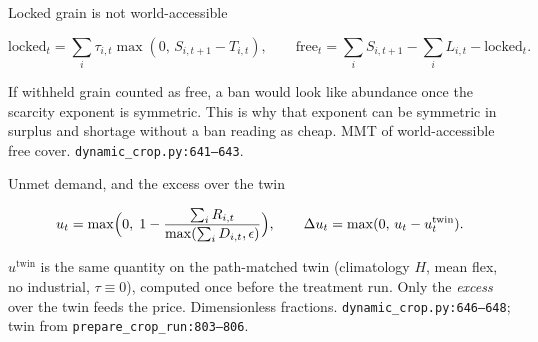 \begin{frame}{Locked grain is not world-accessible}

\[
\mathrm{locked}_t
= \sum_i \tau_{i,t}\max(0,\, S_{i,t+1}-T_{i,t}),
\qquad
\mathrm{free}_t
= \sum_i S_{i,t+1} - \sum_i L_{i,t} - \mathrm{locked}_t.
\]

If withheld grain counted as free, a ban would look like abundance once
the scarcity exponent is symmetric. This is why that exponent can be
symmetric in surplus and shortage without a ban reading as cheap.
{MMT of world-accessible free cover.}
{\texttt{dynamic\_crop.py:641--643}.}
\end{frame}

\begin{frame}{Unmet demand, and the excess over the twin}

\[
u_t = \max\Bigl(0,\; 1 - \frac{\sum_i R_{i,t}}{\max(\sum_i D_{i,t},\epsilon)}\Bigr),
\qquad
\Delta u_t = \max(0,\, u_t - u^{\mathrm{twin}}_t).
\]

$u^{\mathrm{twin}}$ is the same quantity on the path-matched twin
(climatology $H$, mean flex, no industrial, $\tau\equiv 0$), computed once
before the treatment run. Only the \emph{excess} over the twin feeds the
price.
{Dimensionless fractions.}
{\texttt{dynamic\_crop.py:646--648}; twin from \texttt{prepare\_crop\_run:803--806}.}
\end{frame}

